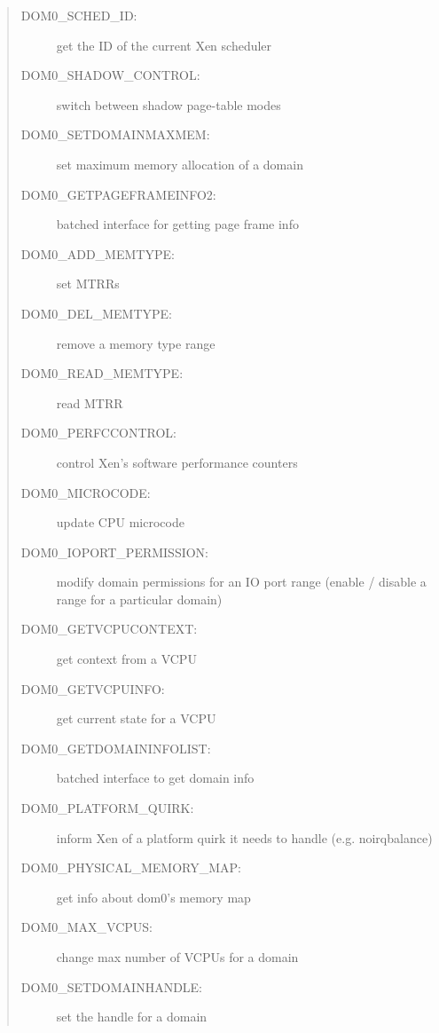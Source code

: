 \documentclass[11pt,twoside,final,openright]{report}
\begin{document}
\begin{quote}
\begin{description}
\item [DOM0\_SCHED\_ID:] get the ID of the current Xen scheduler

\item [DOM0\_SHADOW\_CONTROL:] switch between shadow page-table modes

\item [DOM0\_SETDOMAINMAXMEM:] set maximum memory allocation of a domain

\item [DOM0\_GETPAGEFRAMEINFO2:] batched interface for getting
page frame info

\item [DOM0\_ADD\_MEMTYPE:] set MTRRs

\item [DOM0\_DEL\_MEMTYPE:] remove a memory type range

\item [DOM0\_READ\_MEMTYPE:] read MTRR

\item [DOM0\_PERFCCONTROL:] control Xen's software performance
counters

\item [DOM0\_MICROCODE:] update CPU microcode

\item [DOM0\_IOPORT\_PERMISSION:] modify domain permissions for an
IO port range (enable / disable a range for a particular domain)

\item [DOM0\_GETVCPUCONTEXT:] get context from a VCPU

\item [DOM0\_GETVCPUINFO:] get current state for a VCPU
\item [DOM0\_GETDOMAININFOLIST:] batched interface to get domain
info

\item [DOM0\_PLATFORM\_QUIRK:] inform Xen of a platform quirk it
needs to handle (e.g. noirqbalance)

\item [DOM0\_PHYSICAL\_MEMORY\_MAP:] get info about dom0's memory
map

\item [DOM0\_MAX\_VCPUS:] change max number of VCPUs for a domain

\item [DOM0\_SETDOMAINHANDLE:] set the handle for a domain

\end{description} 
\end{quote} 
\end{document}
